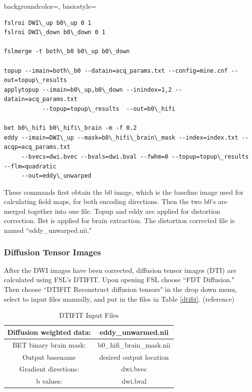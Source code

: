 {
    backgroundcolor=\color{white},
    basicstyle=\scriptsize\color{black}\ttfamily
}

\begin{lstlisting}[style=DOS]
fslroi DWI\_up b0\_up 0 1
fslroi DWI\_down b0\_down 0 1

fslmerge -t both\_b0 b0\_up b0\_down

topup --imain=both\_b0 --datain=acq_params.txt --config=mine.cnf --out=topup\_results
applytopup --imain=b0\_up,b0\_down --inindex=1,2 --datain=acq_params.txt
           --topup=topup\_results  --out=b0\_hifi

bet b0\_hifi b0\_hifi\_brain -m -f 0.2
eddy --imain=DWI\_up --mask=b0\_hifi\_brain\_mask --index=index.txt --acqp=acq_params.txt
     --bvecs=dwi.bvec --bvals=dwi.bval --fwhm=0 --topup=topup\_results --flm=quadratic
     --out=eddy\_unwarped

\end{lstlisting}

These commands first obtain the b0 image, which is the baseline image used for calculating field maps, for both encoding directions. Then the two b0's are merged together into one file. Topup and eddy are applied for distortion correction. Bet is applied for brain extraction. The distortion corrected file is named ``eddy\_unwarped.nii."

\subsubsection{Diffusion Tensor Images}

After the DWI images have been corrected, diffusion tensor images (DTI) are calculated using FSL's DTIFIT. Upon opening FSL choose ``FDT Diffusion." Then choose ``DTIFIT Reconstruct diffusion tensors" in the drop down menu, select to input files manually, and put in the files in Table \ref{dtifit}. (reference)

\begin{table}[H]
\centering
\caption{DTIFIT Input Files}
\label{ta:dtifit}
\begin{tabular}{|c|c|}
\hline
Diffusion weighted data: & eddy\_unwarmed.nii        \\ \hline
BET binary brain mask:   & b0\_hifi\_brain\_mask.nii \\ \hline
Output basename          & desired output location   \\ \hline
Gradient directions:     & dwi.bvec                  \\ \hline
b values:                & dwi.bval                  \\ \hline
\end{tabular}
\end{table}

